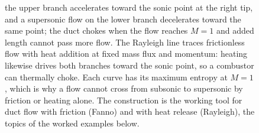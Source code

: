 \begin{figure}[htbp]
{the upper branch accelerates toward the sonic point at the right tip,
and a supersonic flow on the lower branch decelerates toward the same
point; the duct chokes when the flow reaches $M=1$ and added length
cannot pass more flow. The Rayleigh line traces frictionless flow with
heat addition at fixed mass flux and momentum: heating likewise drives
both branches toward the sonic point, so a combustor can thermally
choke. Each curve has its maximum entropy at $M=1$, which is why a
flow cannot cross from subsonic to supersonic by friction or heating
alone. The construction is the working tool for duct flow with friction
(Fanno) and with heat release (Rayleigh), the topics of the worked
examples below.}
\label{fig:vol03ch13:fanno-rayleigh}
\end{figure}
